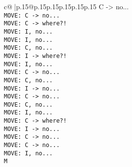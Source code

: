 \documentclass{article}
\begin{document}
{\begin{supertabular}{c@{$\;$}|p{.15\linewidth}@{}p{.15\linewidth}p{.15\linewidth}p{.15\linewidth}p{.15\linewidth}p{.15\linewidth}}
{{{C -> no...\\ \tt  MOVE: C -> no...\\ \tt  MOVE: C -> where?!\\ \tt  MOVE: I, no...\\ \tt  MOVE: I, no...\\ \tt  MOVE: C, no...\\ \tt  MOVE: I -> where?!\\ \tt  MOVE: I, no...\\ \tt  MOVE: C -> no...\\ \tt  MOVE: C, no...\\ \tt  MOVE: I -> no...\\ \tt  MOVE: C -> no...\\ \tt  MOVE: C, no...\\ \tt  MOVE: I, no...\\ \tt  MOVE: C -> where?!\\ \tt  MOVE: I -> no...\\ \tt  MOVE: C -> no...\\ \tt  MOVE: C -> no...\\ \tt  MOVE: I, no...\\ \tt  M}}}
\end{supertabular}}
\end{document}
